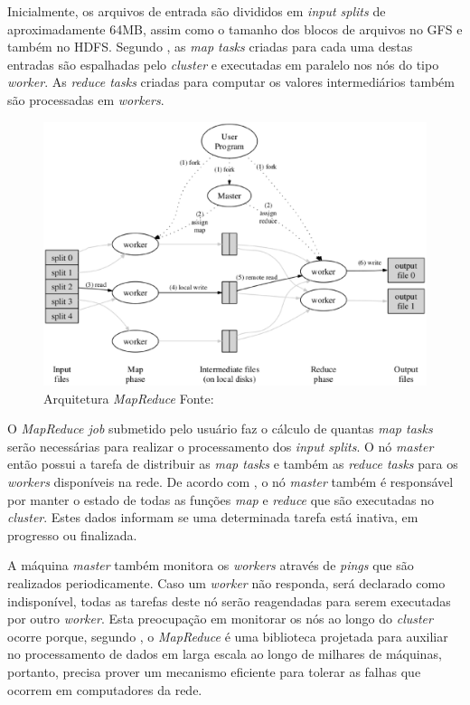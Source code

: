Inicialmente, os arquivos de entrada são divididos em \textit{input splits} de aproximadamente 64MB, assim como o tamanho dos blocos de arquivos no GFS e também no HDFS. Segundo , as \textit{map tasks} criadas para cada uma destas entradas são espalhadas pelo \textit{cluster} e executadas em paralelo nos nós do tipo \textit{worker}. As \textit{reduce tasks} criadas para computar os valores intermediários também são processadas em \textit{workers}.

\begin{figure}[ht!]
	\centering
	\includegraphics[keepaspectratio=true,scale=0.5]
	  {figuras/mapreduce-google.eps}
	\caption[Arquitetura \textit{MapReduce}]{Arquitetura \textit{MapReduce}
	\protect\linebreak Fonte: \cite{ghemawatMapreduce2008}}
	\label{fig-mapreduce-google}
\end{figure}
\FloatBarrier

O \textit{MapReduce job} submetido pelo usuário faz o cálculo de quantas \textit{map tasks} serão necessárias para realizar o processamento dos \textit{input splits}. O nó \textit{master} então possui a tarefa de distribuir as \textit{map tasks} e também as \textit{reduce tasks} para os \textit{workers} disponíveis na rede. De acordo com , o nó \textit{master} também é responsável por manter o estado de todas as funções \textit{map} e \textit{reduce} que são executadas no \textit{cluster}. Estes dados informam se uma determinada tarefa está inativa, em progresso ou finalizada. 

A máquina \textit{master} também monitora os \textit{workers} através de \textit{pings} que são realizados periodicamente. Caso um \textit{worker} não responda, será declarado como indisponível, todas as tarefas deste nó serão reagendadas para serem executadas por outro \textit{worker}. Esta preocupação em monitorar os nós ao longo do \textit{cluster} ocorre porque, segundo , o \textit{MapReduce} é uma biblioteca projetada para auxiliar no processamento de dados em larga escala ao longo de milhares de máquinas, portanto, precisa prover um mecanismo eficiente para tolerar as falhas que ocorrem em computadores da rede.

